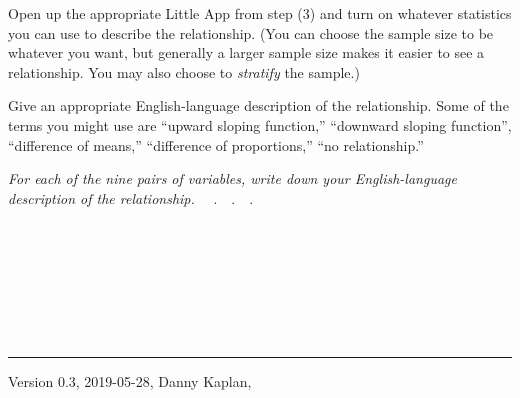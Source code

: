 \documentclass[nofonts,]{tufte-handout}
\begin{document}
\begin{enumerate}
  Open up the appropriate Little App from step (3) and turn on whatever
  statistics you can use to describe the relationship. (You can choose
  the sample size to be whatever you want, but generally a larger sample
  size makes it easier to see a relationship. You may also choose to
  \emph{stratify} the sample.)

  Give an appropriate English-language description of the relationship.
  Some of the terms you might use are ``upward sloping function,''
  ``downward sloping function'', ``difference of means,'' ``difference
  of proportions,'' ``no relationship.''

  \emph{For each of the nine pairs of variables, write down your
  English-language description of the relationship.} ~~.~~.~~. ~

  ~

  ~

  ~

  ~
\end{enumerate}

\begin{center}\rule{0.5\linewidth}{\linethickness}\end{center}

Version 0.3, 2019-05-28, Danny Kaplan,
\end{document}
